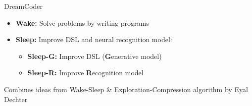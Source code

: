\documentclass{beamer}
\begin{document}
\begin{frame}{DreamCoder}
  \begin{itemize}
  \item   \textbf{Wake:} Solve problems by writing programs
  \item \textbf{Sleep:} Improve DSL and neural recognition model:
    \begin{itemize}
    \item \textbf{Sleep-G:} Improve DSL (\textbf{G}enerative model)
      \item \textbf{Sleep-R:} Improve \textbf{R}ecognition model
      \end{itemize}
  \end{itemize}
  Combines ideas from Wake-Sleep \& Exploration-Compression algorithm by Eyal Dechter


\end{frame}
\end{document}
